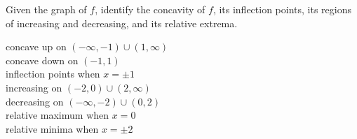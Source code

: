 {Given the graph of $f$, identify the concavity of $f$, its inflection points, its regions of increasing and decreasing, and its relative extrema.\\
}
{concave up on $(-\infty,-1)\cup(1,\infty)$\\
concave down on $(-1,1)$\\
inflection points when $x=\pm1$\\
increasing on $(-2,0)\cup(2,\infty)$\\
decreasing on $(-\infty,-2)\cup(0,2)$\\
relative maximum when $x=0$\\
relative minima when $x=\pm2$
}

